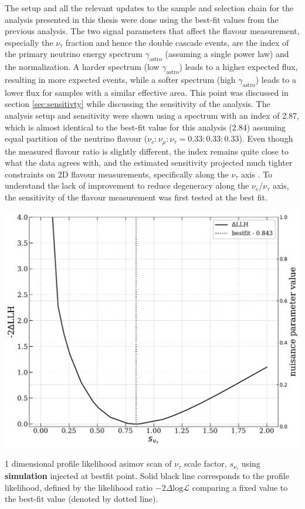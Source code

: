 The setup and all the relevant updates to the sample and selection chain for the analysis presented in this thesis were done using the best-fit values from the previous analysis. The two signal parameters that affect the flavour measurement, especially the $\nu_{\tau}$ fraction and hence the double cascade events, are the index of the primary neutrino energy spectrum $\gamma_{\mathrm{astro}}$ (assuming a single power law) and the normalization. A harder spectrum (low $\gamma_{\mathrm{astro}}$) leads to a higher expected flux, resulting in more expected events, while a softer spectrum (high $\gamma_{\mathrm{astro}}$) leads to a lower flux for samples with a similar effective area. This point was discussed in section \ref{sec:sensitivty} while discussing the sensitivity of the analysis. The analysis setup and sensitivity were shown using a spectrum with an index of 2.87, which is almost identical to the best-fit value for this analysis (2.84) assuming equal partition of the neutrino flavour ($\nu_e : \nu_{\mu} : \nu_{\tau} = 0.33 : 0.33 : 0.33$). Even though the measured flavour ratio is slightly different, the index remains quite close to what the data agrees with, and the estimated sensitivity projected much tighter constraints on 2D flavour measurements, specifically along the $\nu_{\tau}$ axis . To understand the lack of improvement to reduce degeneracy along the $\nu_{e}$/$\nu_{\tau}$ axis, the sensitivity of the flavour measurement was first tested at the best fit.

\begin{marginfigure}
    
    \includegraphics{./figures/results/simulation_profile_scan_astro_nutau_ratio.pdf}
    
    \caption{1 dimensional profile likelihood asimov scan of $\nu_{\tau}$ scale factor, $s_{\nu_{\tau}}$ using \textbf{simulation} injected at bestfit point. Solid black line corresponds to the profile likelihood, defined by the likelihood ratio $-2\Delta\mathrm{log}\mathcal{L}$ comparing a fixed value to the best-fit value (denoted by dotted line).}

\end{marginfigure}

